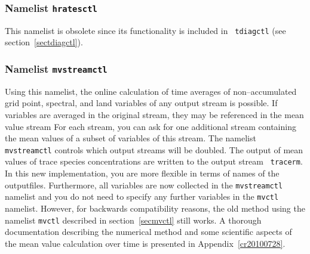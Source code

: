 \subsubsection{Namelist {\tt hratesctl}}\label{sechratesctl}

This namelist is obsolete since its functionality is included in {\tt
  tdiagctl} (see section~\ref{sectdiagctl}).

\subsubsection{Namelist {\tt mvstreamctl}}\label{secmvstreamctl}

Using this namelist, the online calculation of time averages of
non--accumulated grid point, spectral, and land variables
of any output stream is possible. If variables are averaged in the
original stream, they may be referenced in the mean value stream
For each stream, you can ask for one
additional stream containing the mean values of a subset of variables
of this stream. The namelist {\tt mvstreamctl} controls which output
streams will 
be doubled. The output of mean values of trace species concentrations
are written to the output stream {\tt
  tracerm}. In this new implementation, you are more flexible in terms
of names of the outputfiles. Furthermore, all variables are now
collected in the {\tt mvstreamctl} namelist and you do not need to
specify any further variables in the {\tt mvctl} namelist.
However, for backwards compatibility reasons, the old method using
the namelist {\tt mvctl}
described in section~\ref{secmvctl} still works.
A thorough documentation describing the numerical method and some
scientific aspects of the mean value calculation over time is
presented in Appendix~\ref{cr20100728}.

